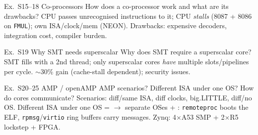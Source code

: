 \begin{example2}{Ex.\ S15--18 Co-processors}
    How does a co-processor work and what are its drawbacks?
    \tcblower
    CPU passes unrecognised instructions to it; CPU \emph{stalls} (8087 + 8086 on \texttt{FMUL}); own ISA/clock/mem (NEON). Drawbacks: expensive decoders, integration cost, compiler burden.
\end{example2}

\begin{example2}{Ex.\ S19 Why SMT needs superscalar}
    Why does SMT require a superscalar core?
    \tcblower
    SMT fills  with a 2nd thread; only superscalar cores \emph{have} multiple slots/pipelines per cycle. $\sim$30\% gain (cache-stall dependent); security issues.
\end{example2}

\begin{example2}{Ex.\ S20--25 AMP / openAMP}
    AMP scenarios? Different ISA under one OS? How do cores communicate?
    \tcblower
    Scenarios: diff/same ISA, diff clocks, big.LITTLE, diff/no OS. Different ISA under one OS =  $\to$ separate OSes + : \texttt{remoteproc} boots the ELF, \texttt{rpmsg}/\texttt{virtio} ring buffers carry messages. Zynq: 4$\times$A53 SMP + 2$\times$R5 lockstep + FPGA.
\end{example2}
